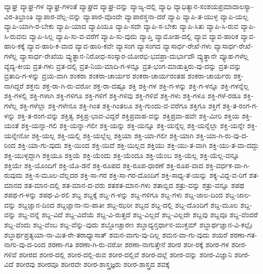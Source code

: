 {ವ್ಯಾಘ್ರ
ವ್ಯಾಘ್ರ-ಗಳ
ವ್ಯಾಘ್ರ-ಗಳಂತೆ
ವ್ಯಾಘ್ರದ
ವ್ಯಾಘ್ರ-ವನ್ನು
ವ್ಯಾಜ್ಯ-ದಲ್ಲಿ
ವ್ಯಾಧಿ
ವ್ಯಾಧಿತ್ಯಾನ-ಸಂಶಯಪ್ರಮಾದಾಲಸ್ಯಾ-ವಿರ-ತಿಭ್ರಾಂತಿ
ವ್ಯಾಪಾರ-ವೆಲ್ಲ-ವನ್ನು
ವ್ಯಾಪಾರ-ವೊಂದೇ
ವ್ಯಾಪಾರಸ್ಥನಾ-ದರೆ
ವ್ಯಾಪಿ
ವ್ಯಾಪಿ-ತ-ಯುಳ್ಳ
ವ್ಯಾಪಿ-ಯಲ್ಲ
ವ್ಯಾಪಿ-ಯಾಗಿ-ರ-ಬೇಕು
ವ್ಯಾಪಿ-ಯಾದ
ವ್ಯಾಪಿಯೂ
ವ್ಯಾಪಿ-ಸದೇ
ವ್ಯಾಪಿ-ಸ-ಬೇಕು
ವ್ಯಾಪಿ-ಸಿತು
ವ್ಯಾಪಿ-ಸಿ-ರುವ
ವ್ಯಾಪಿ-ಸಿ-ರುವನು
ವ್ಯಾಪಿ-ಸಿಲ್ಲ
ವ್ಯಾಪಿ-ಸು-ವ-ವರೆಗೆ
ವ್ಯಾಪಿ-ಸು-ವುದು
ವ್ಯಾಪ್ತಿ
ವ್ಯಾಮೋಹ-ದಲ್ಲಿ
ವ್ಯಾವ
ವ್ಯಾವ-ಹಾರಿಕ
ವ್ಯಾವ-ಹಾರಿ-ಕಕ್ಕೆ
ವ್ಯಾವ-ಹಾರಿ-ಕ-ವಾದ
ವ್ಯಾವ-ಹಾರಿ-ಕವೇ
ವ್ಯಾಸಂಗ
ವ್ಯಾಸಂಗದ
ವ್ಯಾಸಾರ್ಧ-ರೇಖೆ-ಗಳು
ವ್ಯಾಸಾರ್ಧ-ರೇಖೆ-ಗಳೆಲ್ಲ
ವ್ಯಾಸಾರ್ಧ-ರೇಖೆಯ
ವ್ಯುತ್ಥಾನ-ನಿರೋಧ-ಸಂಸ್ಕಾರ-ಯೋರಭಿ-ಭವಪ್ರಾ-ದುರ್ಭಾವೌ
ವ್ಯುತ್ಥಾನೇ
ವ್ಯೂಹ-ಗಳೆಲ್ಲ
ವ್ಯೆದ್ಯ-ಕೀಯ
ವ್ರತ-ಗಳು
ವ್ರತ-ದಲ್ಲಿ
ವ್ರತ-ನಿಯ-ಮಾದಿ-ಗ-ಳನ್ನೂ
ವ್ರತ-ಭಂಗ-ಮಾಡುತ್ತಿರು-ವು-ದನ್ನು
ವ್ರತ-ವನ್ನು
ವ್ರತಾದಿ-ಗ-ಳನ್ನು
ವ್ರಯ-ವಾಗಿ
ಶಂಕರಾ
ಶಂಕರಾ-ಚಾರ್ಯರ
ಶಂಕರಾ-ಚಾರ್ಯರಂತಹ
ಶಂಕರಾ-ಚಾರ್ಯರು
ಶಕ್ತ-ನಾಗಿದ್ದರೆ
ಶಕ್ತನು
ಶಕ್ತ-ರಾ-ಗಿ-ರು-ವರೋ
ಶಕ್ತ-ರಾ-ದಷ್ಟೂ
ಶಕ್ತಿ
ಶಕ್ತಿ-ಗಳ
ಶಕ್ತಿ-ಗ-ಳನ್ನು
ಶಕ್ತಿ-ಗ-ಳನ್ನೂ
ಶಕ್ತಿ-ಗಳನ್ನೆಲ್ಲ
ಶಕ್ತಿ-ಗಳಲ್ಲಿ
ಶಕ್ತಿ-ಗಳಾಗಿ
ಶಕ್ತಿ-ಗಳಿಗೂ
ಶಕ್ತಿ-ಗಳಿಗೆ
ಶಕ್ತಿ-ಗಳಿವು
ಶಕ್ತಿ-ಗಳಿವೆ
ಶಕ್ತಿ-ಗಳು
ಶಕ್ತಿ-ಗಳೂ
ಶಕ್ತಿ-ಗಳೆ-ರಡೂ
ಶಕ್ತಿ-ಗಳೆಲ್ಲ
ಶಕ್ತಿ-ಗಳೆಲ್ಲಾ
ಶಕ್ತಿ-ಗಳೇನೂ
ಶಕ್ತಿ-ಗಿಂತ
ಶಕ್ತಿ-ಗಿಂತಲೂ
ಶಕ್ತಿ-ಗುಂದು-ವ-ವರೆಗೂ
ಶಕ್ತಿಗೂ
ಶಕ್ತಿಗೆ
ಶಕ್ತಿ-ತ-ರಂಗ-ಗ-ಳನ್ನು
ಶಕ್ತಿ-ತ-ರಂಗ-ವನ್ನು
ಶಕ್ತಿತ್ವ
ಶಕ್ತಿಪ್ರ-ಭಾವ-ವಿದ್ದರೆ
ಶಕ್ತಿಪ್ರವಾಹ-ವನ್ನು
ಶಕ್ತಿಪ್ರವಾ-ಹವೇ
ಶಕ್ತಿ-ಮೀರಿ
ಶಕ್ತಿಯ
ಶಕ್ತಿ-ಯಂತೆ
ಶಕ್ತಿ-ಯನ್ನಾ-ಗಲಿ
ಶಕ್ತಿ-ಯನ್ನಾ-ಗಲೀ
ಶಕ್ತಿ-ಯನ್ನು
ಶಕ್ತಿ-ಯನ್ನೂ
ಶಕ್ತಿ-ಯನ್ನೆಲ್ಲ
ಶಕ್ತಿ-ಯನ್ನೆಲ್ಲಾ
ಶಕ್ತಿ-ಯನ್ನೇ
ಶಕ್ತಿ-ಯನ್ನೇನೋ
ಶಕ್ತಿ-ಯಲ್ಲ
ಶಕ್ತಿ-ಯಲ್ಲಿ
ಶಕ್ತಿ-ಯಲ್ಲೆಲ್ಲ
ಶಕ್ತಿಯಾ
ಶಕ್ತಿ-ಯಾ-ಗಲೀ
ಶಕ್ತಿ-ಯಾಗಿ
ಶಕ್ತಿ-ಯಾ-ಗಿ-ರು-ವು-ದ-ರಿಂದ
ಶಕ್ತಿ-ಯಾ-ಗು-ವುದು
ಶಕ್ತಿ-ಯಿಂದ
ಶಕ್ತಿ-ಯಿದೆ
ಶಕ್ತಿ-ಯಿಲ್ಲದ
ಶಕ್ತಿಯು
ಶಕ್ತಿ-ಯು-ತ-ವಾಗಿ
ಶಕ್ತಿ-ಯು-ತ-ವಾ-ದದ್ದು
ಶಕ್ತಿ-ಯುಳ್ಳದ್ದಾಗಿ
ಶಕ್ತಿಯೂ
ಶಕ್ತಿಯೆ
ಶಕ್ತಿ-ಯೆಂದು
ಶಕ್ತಿ-ಯೆಂದೂ
ಶಕ್ತಿ-ಯೆಂಬ
ಶಕ್ತಿ-ಯೆಲ್ಲ
ಶಕ್ತಿ-ಯೆಲ್ಲ-ವನ್ನೂ
ಶಕ್ತಿಯೇ
ಶಕ್ತಿ-ಯೊಂದಿಗೆ
ಶಕ್ತಿ-ಯೊ-ಡನೆ
ಶಕ್ತಿ-ರೂಪದ
ಶಕ್ತಿ-ರೂಪ-ಧಾರಣೆ
ಶಕ್ತಿ-ರೂಪ-ವಾದ
ಶಕ್ತಿ-ವರ್ಧಕ-ವಾ-ಗಿ-ರುವುದು
ಶಕ್ತಿ-ಸ-ಮೂಲ-ವೆಲ್ಲದರ
ಶಕ್ತಿ-ಸಾ-ಗರ
ಶಕ್ತಿ-ಸಾ-ಗರ-ದೊಂದಿಗೆ
ಶಕ್ತಿ-ಸಾಧ್ಯ-ತೆ-ಯನ್ನು
ಶಕ್ಯ-ವಿದ್ದ-ವ-ರಿಗೆ
ಶತ-ಮಾನದ
ಶತ-ಮಾನ-ದಲ್ಲಿ
ಶತ-ಮಾನ-ದ-ವರು
ಶತಶತ-ಮಾನ-ಗಳು
ಶತಾಬ್ದಿದ
ಶತ್ರು-ವನ್ನು
ಶತ್ರು-ವನ್ನೂ
ಶಪಥ
ಶಪಥ-ಗ-ಳನ್ನು
ಶಪಥ-ವಿ-ರಲಿ
ಶಬ್ದ
ಶಬ್ದಕ್ಕೆ
ಶಬ್ದ-ಗ-ಳನ್ನು
ಶಬ್ದ-ಗಳಿಗೂ
ಶಬ್ದ-ಗಳು
ಶಬ್ದ-ಜಾಲ-ದಿಂದ
ಶಬ್ದ-ಜಾಲ-ವನ್ನು
ಶಬ್ದಜ್ಞಾನ-ದಿಂದ
ಶಬ್ದಜ್ಞಾನಾ-ನು-ಪಾತೀ
ಶಬ್ದ-ಝರೀ
ಶಬ್ದದ
ಶಬ್ದ-ದಲ್ಲಿ
ಶಬ್ದ-ದೊಂದಿಗೆ
ಶಬ್ದ-ಮೂಲ
ಶಬ್ದ-ವನ್ನು
ಶಬ್ದ-ವನ್ನೆ
ಶಬ್ದ-ವಿದೆ
ಶಬ್ದ-ವಿದೆಯೆ
ಶಬ್ದ-ವಿ-ರುತ್ತದೆ
ಶಬ್ದ-ವಿಲ್ಲದೆ
ಶಬ್ದ-ವಿಲ್ಲದೇ
ಶಬ್ದವು
ಶಬ್ದವೂ
ಶಬ್ದ-ವೆಂದರೆ
ಶಬ್ದ-ವೆಂದು
ಶಬ್ದ-ವೆಂಬ
ಶಬ್ದ-ವೆನ್ನು-ವುದು
ಶಬ್ದೋಚ್ಚಾರಣ
ಶಬ್ಧಾದ್ಯನ್ತರ್ಧಾನ-ಮುಕ್ತಮ್
ಶಬ್ಧಾರ್ಥಜ್ಞಾನ-ವಿ-ಕಲ್ಪೈಃ
ಶಬ್ಧಾರ್ಥಪ್ರತ್ಯಯಾ-ನಾ-ಮಿತ-ರೇ-ತರಾಧ್ಯಾಸಾತ್
ಶಮನ-ವಾಗು-ವು-ದಿಲ್ಲ
ಶಮನ-ವಾ-ಗು-ವುದು
ಶಯರೆ
ಶರಣಾ-ಗತ-ನಾಗು-ವು-ದ-ರಿಂದ
ಶರಣಾ-ಗತಿ
ಶರಣಾ-ಗಿ-ರು-ವರೋ
ಶರಣಾ-ನಾಗುತ್ತೇನೆ
ಶರೀರ
ಶರೀ-ರಕ್ಕೆ
ಶರೀರ-ಗಳ
ಶರೀರ-ಗಳಿವೆ
ಶರೀರದ
ಶರೀರ-ದಲ್ಲಿ
ಶರೀರ-ದಲ್ಲಿ-ರುವ
ಶರೀರ-ದಲ್ಲಿವೆ
ಶರೀರ-ದಲ್ಲೆ
ಶರೀರ-ವನ್ನು
ಶರೀರ-ವಿಜ್ಞಾನಿ
ಶರೀರ-ವಿದೆ
ಶರೀರವು
ಶರೀರವೂ
ಶರೀರವೇ
ಶರೀರ-ಶಾಸ್ತ್ರಜ್ಞರು
ಶರೀರ-ಶಾಸ್ತ್ರದ
ಶವಕ್ಕೆ
}
